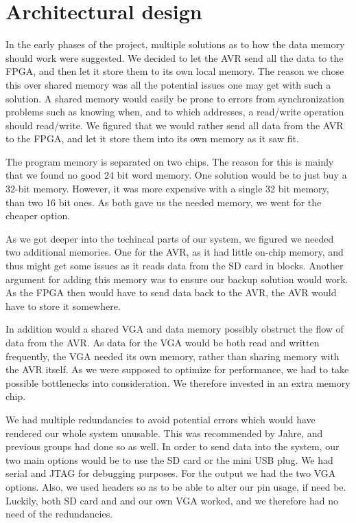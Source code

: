 \section {Architectural design}
 In the early phases of the project,
multiple solutions as to how the data memory should work were suggested. We
decided to let the AVR send all the data to the \ac{FPGA}, and then let it store
them to its own local memory. The reason we chose this over shared memory was
all the potential issues one may get with such a solution. A shared memory would
easily be prone to errors from synchronization problems such as knowing when,
and to which addresses, a read/write operation should read/write. We figured
that we would rather send all data from the AVR to the \ac{FPGA}, and let it
store them into its own memory as it saw fit.

The program memory is
separated on two chips. The reason for this is mainly that we found no good 24
bit word memory. One solution would be to just buy a 32-bit memory. However, it
was more expensive with a single 32 bit memory, than two 16 bit ones. As both
gave us the needed memory, we went for the cheaper option.

 As we got deeper into the techincal parts of our
system, we figured we needed two additional memories. One for the AVR, as it had
little on-chip memory, and thus might get some issues as it reads data from the
\ac{SD} card in blocks. Another argument for adding this memory was
to ensure our backup solution would work. As the \ac{FPGA} then would have to
send data back to the AVR, the AVR would have to store it somewhere.

In addition would a shared \ac{VGA} and data memory possibly obstruct the flow
of data from the AVR. As data for the \ac{VGA} would be both read and written
frequently, the \ac{VGA} needed its own memory, rather than sharing memory with
the AVR itself. As we were supposed to optimize for performance, we had to take
possible bottlenecks into consideration. We therefore invested in an extra
memory chip.

 We had multiple redundancies to avoid potential
errors which would have rendered our whole system unusable. This was recommended
by Jahre, and previous groups had done so as well. In order to send data into
the system, our two main options would be to use the \ac{SD} card or the mini
\ac{USB} plug. We had serial and \ac{JTAG} for debugging purposes. For the
output we had the two \ac{VGA} options. Also, we used headers so as to be able
to alter our pin usage, if need be. Luckily, both \ac{SD} card and and our
own \ac{VGA} worked, and we therefore had no need of the
redundancies. 

